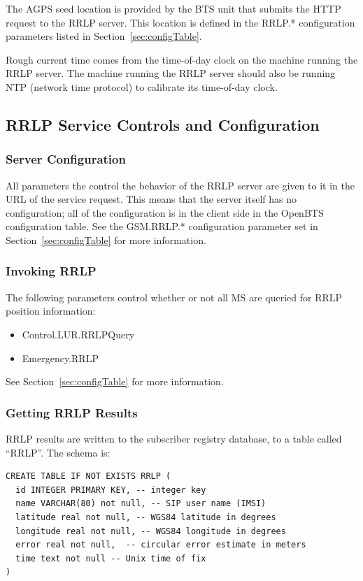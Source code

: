 \documentclass[11pt,openany]{book}
\begin{document}
The AGPS seed location is provided by the BTS unit that submits the HTTP request to the RRLP server.  This location is defined in the RRLP.* configuration parameters listed in Section~\ref{sec:configTable}.

Rough current time comes from the time-of-day clock on the machine running the RRLP server.  The machine running the RRLP server should also be running NTP (network time protocol) to calibrate its time-of-day clock.

\subsection{RRLP Service Controls and Configuration}

\subsubsection{Server Configuration}
All parameters the control the behavior of the RRLP server are given to it in the URL of the service request.
This means that the server itself has no configuration; all of the configuration is in the client side in the OpenBTS configuration table.  See the GSM.RRLP.* configuration parameter set in Section~\ref{sec:configTable} for more information.

\subsubsection{Invoking RRLP}
The following parameters control whether or not all MS are queried for RRLP position information:
\begin{itemize}
	\item Control.LUR.RRLPQuery
	\item Emergency.RRLP
\end{itemize}
See Section~\ref{sec:configTable} for more information.


\subsubsection{Getting RRLP Results}
RRLP results are written to the subscriber registry database, to a table called ``RRLP''.
The schema is:
\begin{verbatim}
CREATE TABLE IF NOT EXISTS RRLP (
  id INTEGER PRIMARY KEY, -- integer key
  name VARCHAR(80) not null, -- SIP user name (IMSI)
  latitude real not null, -- WGS84 latitude in degrees
  longitude real not null, -- WGS84 longitude in degrees
  error real not null,  -- circular error estimate in meters
  time text not null -- Unix time of fix
)
\end{verbatim}
\end{document}
